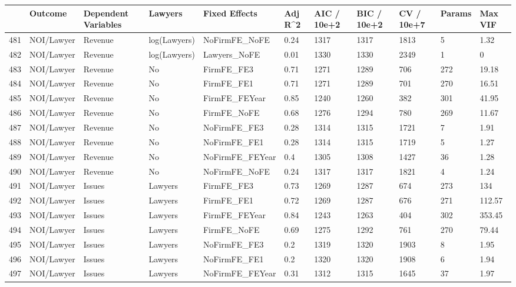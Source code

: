 \begin{table}[ht]
\centering
\begin{tabular}{rllllllllll}
  \hline
 & Outcome & Dependent Variables & Lawyers & Fixed Effects & Adj R^2 & AIC / 10e+2 & BIC / 10e+2 & CV / 10e+7 & Params & Max VIF \\ 
  \hline
481 & NOI/Lawyer & Revenue & log(Lawyers) & NoFirmFE\_NoFE & 0.24 & 1317 & 1317 & 1813 & 5 & 1.32 \\ 
  482 & NOI/Lawyer & Revenue & log(Lawyers) & Lawyers\_NoFE & 0.01 & 1330 & 1330 & 2349 & 1 & 0 \\ 
  483 & NOI/Lawyer & Revenue & No & FirmFE\_FE3 & 0.71 & 1271 & 1289 & 706 & 272 & 19.18 \\ 
  484 & NOI/Lawyer & Revenue & No & FirmFE\_FE1 & 0.71 & 1271 & 1289 & 701 & 270 & 16.51 \\ 
  485 & NOI/Lawyer & Revenue & No & FirmFE\_FEYear & 0.85 & 1240 & 1260 & 382 & 301 & 41.95 \\ 
  486 & NOI/Lawyer & Revenue & No & FirmFE\_NoFE & 0.68 & 1276 & 1294 & 780 & 269 & 11.67 \\ 
  487 & NOI/Lawyer & Revenue & No & NoFirmFE\_FE3 & 0.28 & 1314 & 1315 & 1721 & 7 & 1.91 \\ 
  488 & NOI/Lawyer & Revenue & No & NoFirmFE\_FE1 & 0.28 & 1314 & 1315 & 1719 & 5 & 1.27 \\ 
  489 & NOI/Lawyer & Revenue & No & NoFirmFE\_FEYear & 0.4 & 1305 & 1308 & 1427 & 36 & 1.28 \\ 
  490 & NOI/Lawyer & Revenue & No & NoFirmFE\_NoFE & 0.24 & 1317 & 1317 & 1821 & 4 & 1.24 \\ 
  491 & NOI/Lawyer & Issues & Lawyers & FirmFE\_FE3 & 0.73 & 1269 & 1287 & 674 & 273 & 134 \\ 
  492 & NOI/Lawyer & Issues & Lawyers & FirmFE\_FE1 & 0.72 & 1269 & 1287 & 676 & 271 & 112.57 \\ 
  493 & NOI/Lawyer & Issues & Lawyers & FirmFE\_FEYear & 0.84 & 1243 & 1263 & 404 & 302 & 353.45 \\ 
  494 & NOI/Lawyer & Issues & Lawyers & FirmFE\_NoFE & 0.69 & 1275 & 1292 & 761 & 270 & 79.44 \\ 
  495 & NOI/Lawyer & Issues & Lawyers & NoFirmFE\_FE3 & 0.2 & 1319 & 1320 & 1903 & 8 & 1.95 \\ 
  496 & NOI/Lawyer & Issues & Lawyers & NoFirmFE\_FE1 & 0.2 & 1320 & 1320 & 1908 & 6 & 1.94 \\ 
  497 & NOI/Lawyer & Issues & Lawyers & NoFirmFE\_FEYear & 0.31 & 1312 & 1315 & 1645 & 37 & 1.97 \\ 

\end{tabular}
\end{table}
